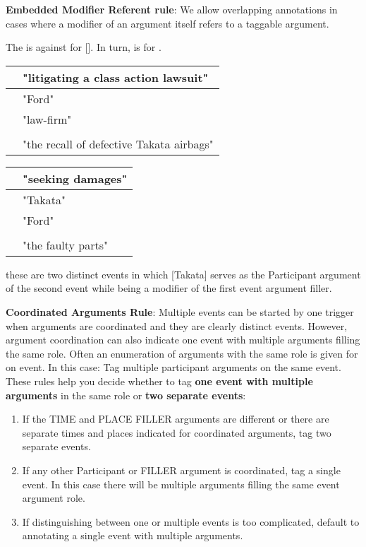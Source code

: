 \noindent\textbf{Embedded Modifier Referent rule}:
We allow overlapping annotations in cases where a modifier of an argument itself refers to a taggable argument.

\begin{exe}
    \ex The  is  against  for []. In turn,  is  for .
    \expl \begin{tabular}{|L{6cm}|L{7cm}|} \hline
         & "litigating a class action lawsuit" \\\hline
         & "Ford" \\
         & "law-firm" \\
         &  \\
         & "the recall of defective Takata airbags" \\
        \hline \end{tabular}
    \expl \begin{tabular}{|L{6cm}|L{7cm}|} \hline
         & "seeking damages" \\\hline
         & "Takata" \\
         & "Ford" \\
         &  \\
         & "the faulty parts" \\
        \hline \end{tabular}
    \expl these are two distinct events in which [Takata] serves as the  Participant argument of the second event while being a modifier of the first event argument filler. 
\end{exe}

\noindent\textbf{Coordinated Arguments Rule}:
Multiple events can be started by one trigger when arguments are coordinated and they are clearly distinct events.
However, argument coordination can also indicate one event with multiple arguments filling the same role.
Often an enumeration of arguments with the same role is given for on event. In this case: Tag multiple participant arguments on the same event.
These rules help you decide whether to tag \textbf{one event with multiple arguments} in the same role or \textbf{two separate events}:
\begin{enumerate}
    \item If the TIME and PLACE FILLER arguments are different or there are separate times and places indicated for coordinated arguments, tag two separate events.
    \item If any other Participant or FILLER argument is coordinated, tag a single event.
    In this case there will be multiple arguments filling the same event argument role.
    \item If distinguishing between one or multiple events is too complicated, default to annotating a single event with multiple arguments.
\end{enumerate}


